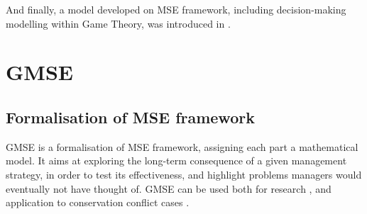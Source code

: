 \documentclass[12pt,a4paper]{article}
\begin{document}
And finally, a model developed on MSE framework, including decision-making modelling within Game Theory, was introduced in \cite{duthie2018}.

\section{GMSE}%

\subsection{Formalisation of MSE framework}

GMSE is a formalisation of MSE framework, assigning each part a mathematical model.
It aims at exploring the long-term consequence of a given management strategy, in order to test its effectiveness, and highlight problems managers would eventually not have thought of.
GMSE can be used both for research \citep{cusack2018time}, and application to conservation conflict cases \citep{bainbridge2017goose}.
\end{document}
